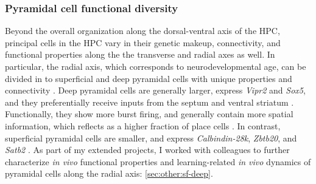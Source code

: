 \subsubsection{Pyramidal cell functional diversity}
\label{sec:intro:memory:diversity}
Beyond the overall organization along the dorsal-ventral axis of the \ac{HPC}, principal cells in the \ac{HPC} vary in their genetic makeup, connectivity, and functional properties along the the transverse \citep{Igarashi2014} and radial \citep{Slomianka2011} axes as well.
In particular, the radial axis, which corresponds to neurodevelopmental age, can be divided in to superficial and deep pyramidal cells with unique properties and connectivity \citep{Angevine1965, Schlessinger1978, Deguchi2011}. 
Deep pyramidal cells are generally larger, express \emph{Vipr2} and \emph{Sox5}, and they preferentially receive inputs from the septum and ventral striatum \citep{Nielsen2010, Sorensen1993, Sorensen1995}.
Functionally, they show more burst firing, and generally contain more spatial information, which reflects as a higher fraction of place cells \citep{Mizuseki2011}.
In contrast, superficial pyramidal cells are smaller, and express \emph{Calbindin-28k}, \emph{Zbtb20}, and \emph{Satb2} \citep{Sloviter1989, Slomianka1992}.
As part of my extended projects, I worked with colleagues to further characterize \emph{in vivo} functional properties and learning-related \emph{in vivo} dynamics of pyramidal cells along the radial axis: \autoref{sec:other:sf-deep}.

